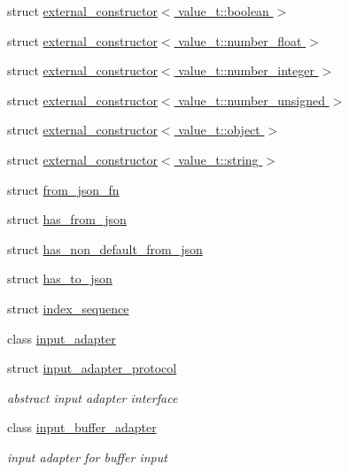 \begin{DoxyCompactItemize}
struct \hyperlink{structnlohmann_1_1detail_1_1external__constructor_3_01value__t_1_1boolean_01_4}{external\+\_\+constructor$<$ value\+\_\+t\+::boolean $>$}
\item 
struct \hyperlink{structnlohmann_1_1detail_1_1external__constructor_3_01value__t_1_1number__float_01_4}{external\+\_\+constructor$<$ value\+\_\+t\+::number\+\_\+float $>$}
\item 
struct \hyperlink{structnlohmann_1_1detail_1_1external__constructor_3_01value__t_1_1number__integer_01_4}{external\+\_\+constructor$<$ value\+\_\+t\+::number\+\_\+integer $>$}
\item 
struct \hyperlink{structnlohmann_1_1detail_1_1external__constructor_3_01value__t_1_1number__unsigned_01_4}{external\+\_\+constructor$<$ value\+\_\+t\+::number\+\_\+unsigned $>$}
\item 
struct \hyperlink{structnlohmann_1_1detail_1_1external__constructor_3_01value__t_1_1object_01_4}{external\+\_\+constructor$<$ value\+\_\+t\+::object $>$}
\item 
struct \hyperlink{structnlohmann_1_1detail_1_1external__constructor_3_01value__t_1_1string_01_4}{external\+\_\+constructor$<$ value\+\_\+t\+::string $>$}
\item 
struct \hyperlink{structnlohmann_1_1detail_1_1from__json__fn}{from\+\_\+json\+\_\+fn}
\item 
struct \hyperlink{structnlohmann_1_1detail_1_1has__from__json}{has\+\_\+from\+\_\+json}
\item 
struct \hyperlink{structnlohmann_1_1detail_1_1has__non__default__from__json}{has\+\_\+non\+\_\+default\+\_\+from\+\_\+json}
\item 
struct \hyperlink{structnlohmann_1_1detail_1_1has__to__json}{has\+\_\+to\+\_\+json}
\item 
struct \hyperlink{structnlohmann_1_1detail_1_1index__sequence}{index\+\_\+sequence}
\item 
class \hyperlink{classnlohmann_1_1detail_1_1input__adapter}{input\+\_\+adapter}
\item 
struct \hyperlink{structnlohmann_1_1detail_1_1input__adapter__protocol}{input\+\_\+adapter\+\_\+protocol}
\begin{DoxyCompactList}\small\item\em abstract input adapter interface \end{DoxyCompactList}\item 
class \hyperlink{classnlohmann_1_1detail_1_1input__buffer__adapter}{input\+\_\+buffer\+\_\+adapter}
\begin{DoxyCompactList}\small\item\em input adapter for buffer input \end{DoxyCompactList}\item 

\end{DoxyCompactItemize}
